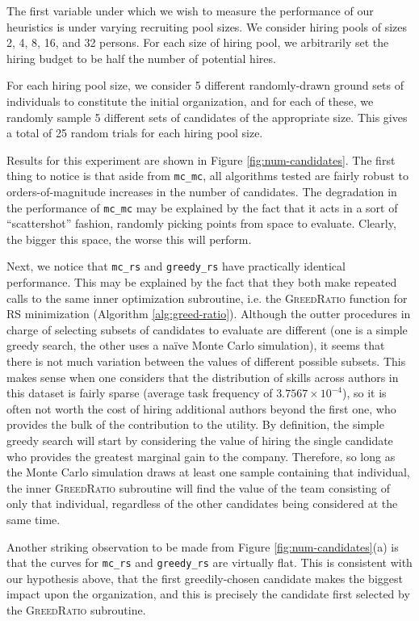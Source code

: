 The first variable under which we wish to measure the performance of our heuristics is under varying recruiting pool sizes.
We consider hiring pools of sizes 2, 4, 8, 16, and 32 persons.
For each size of hiring pool, we arbitrarily set the hiring budget to be half the number of potential hires.

For each hiring pool size, we consider 5 different randomly-drawn ground sets of individuals to constitute the initial organization, and for each of these, we randomly sample 5 different sets of candidates of the appropriate size.
This gives a total of 25 random trials for each hiring pool size.

Results for this experiment are shown in Figure \ref{fig:num-candidates}.
The first thing to notice is that aside from \texttt{mc\_mc}, all algorithms tested are fairly robust to orders-of-magnitude increases in the number of candidates.
The degradation in the performance of \texttt{mc\_mc} may be explained by the fact that it acts in a sort of ``scattershot'' fashion, randomly picking points from space to evaluate.
Clearly, the bigger this space, the worse this will perform.

Next, we notice that \texttt{mc\_rs} and \texttt{greedy\_rs} have practically identical performance.
This may be explained by the fact that they both make repeated calls to the same inner optimization subroutine, i.e. the \textsc{GreedRatio} function for RS minimization (Algorithm \ref{alg:greed-ratio}).
Although the outter procedures in charge of selecting subsets of candidates to evaluate are different (one is a simple greedy search, the other uses a na\"ive Monte Carlo simulation), it seems that there is not much variation between the values of different possible subsets.
This makes sense when one considers that the distribution of skills across authors in this dataset is fairly sparse (average task frequency of $ 3.7567 \times 10^{-4} $), so it is often not worth the cost of hiring additional authors beyond the first one, who provides the bulk of the contribution to the utility.
By definition, the simple greedy search will start by considering the value of hiring the single candidate who provides the greatest marginal gain to the company.
Therefore, so long as the Monte Carlo simulation draws at least one sample containing that individual, the inner \textsc{GreedRatio} subroutine will find the value of the team consisting of only that individual, regardless of the other candidates being considered at the same time.

Another striking observation to be made from Figure \ref{fig:num-candidates}(a) is that the curves for \texttt{mc\_rs} and \texttt{greedy\_rs} are virtually flat.
This is consistent with our hypothesis above, that the first greedily-chosen candidate makes the biggest impact upon the organization, and this is precisely the candidate first selected by the \textsc{GreedRatio} subroutine.

